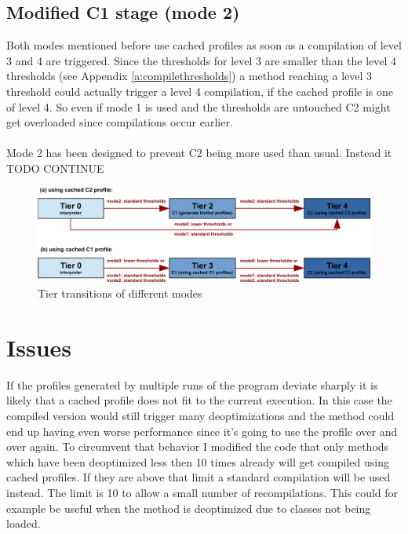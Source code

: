 \subsection{Modified C1 stage (mode 2)}
\label{s:mode2}
Both modes mentioned before use cached profiles as soon as a compilation of level 3 and 4 are triggered. Since the thresholds for level 3 are smaller than the level 4 thresholds (see Appendix \ref{a:compilethresholds}) a method reaching a level 3 threshold could actually trigger a level 4 compilation, if the cached profile is one of level 4. So even if mode 1 is used and the thresholds are untouched C2 might get overloaded since compilations occur earlier.
\\\\
Mode 2 has been designed to prevent C2 being more used than usual. Instead it TODO CONTINUE
\begin{figure}[h]
  \begin{center}
    \centering
    \includegraphics{figures/hs_tiers_threshold.png}
    \caption{Tier transitions of different modes}
    \label{f:hs_tiers_thresholds}
  \end{center}
\end{figure}


\section{Issues}
\label{s:issues}
If the profiles generated by multiple runs of the program deviate sharply it is likely that a cached profile does not fit to the current execution. In this case the compiled version would still trigger many deoptimizations and the method could end up having even worse performance since it's going to use the profile over and over again.
To circumvent that behavior I modified the code that only methods which have been deoptimized less then 10 times already will get compiled using cached profiles. If they are above that limit a standard compilation will be used instead.
The limit is 10 to allow a small number of recompilations. This could for example be useful when the method is deoptimized due to classes not being loaded. 
\\\\

